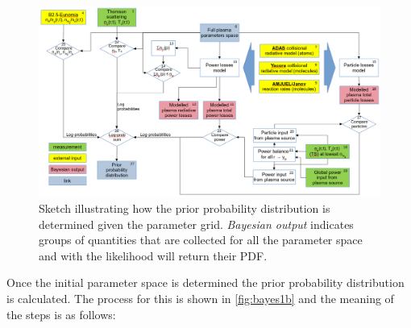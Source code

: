 \begin{figure}
	\centering
	\includegraphics[scale=0.29,trim={0 0 0 0},clip]{Chapters/chapter3/figs/bayesian_steps12.png}
	\caption{Sketch illustrating how the prior probability distribution is determined given the parameter grid. \emph{Bayesian output} indicates groups of quantities that are collected for all the parameter space and with the likelihood will return their PDF.}
	\label{fig:bayes1b}
\end{figure}

Once the initial parameter space is determined the prior probability distribution is calculated. The process for this is shown in \autoref{fig:bayes1b} and the meaning of the steps is as follows:

